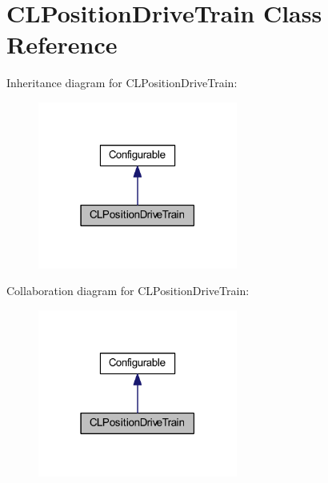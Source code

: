 \hypertarget{class_c_l_position_drive_train}{
\section{\-C\-L\-Position\-Drive\-Train \-Class \-Reference}
\label{class_c_l_position_drive_train}
}


\-Inheritance diagram for \-C\-L\-Position\-Drive\-Train\-:\nopagebreak
\begin{figure}[H]
\begin{center}
\leavevmode
\includegraphics[width=186pt]{class_c_l_position_drive_train__inherit__graph}
\end{center}
\end{figure}


\-Collaboration diagram for \-C\-L\-Position\-Drive\-Train\-:\nopagebreak
\begin{figure}[H]
\begin{center}
\leavevmode
\includegraphics[width=186pt]{class_c_l_position_drive_train__coll__graph}
\end{center}
\end{figure}
